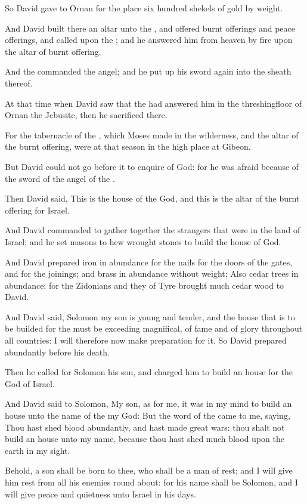 \Verse So David gave to Ornan for the place six hundred shekels of gold by weight.

\Verse And David built there an altar unto the \LORD, and offered burnt offerings and peace offerings, and called upon the \LORD; and he answered him from heaven by fire upon the altar of burnt offering.

\Verse And the \LORD commanded the angel; and he put up his sword again into the sheath thereof.

\Verse At that time when David saw that the \LORD had answered him in the threshingfloor of Ornan the Jebusite, then he sacrificed there.

\Verse For the tabernacle of the \LORD, which Moses made in the wilderness, and the altar of the burnt offering, were at that season in the high place at Gibeon.

\Verse But David could not go before it to enquire of God: for he was afraid because of the sword of the angel of the \LORD.


\Chapter
\Verse Then David said, This is the house of the \LORD God, and this is the altar of the burnt offering for Israel.

\Verse And David commanded to gather together the strangers that were in the land of Israel; and he set masons to hew wrought stones to build the house of God.

\Verse And David prepared iron in abundance for the nails for the doors of the gates, and for the joinings; and brass in abundance without weight; \Verse Also cedar trees in abundance: for the Zidonians and they of Tyre brought much cedar wood to David.

\Verse And David said, Solomon my son is young and tender, and the house that is to be builded for the \LORD must be exceeding magnifical, of fame and of glory throughout all countries: I will therefore now make preparation for it. So David prepared abundantly before his death.

\Verse Then he called for Solomon his son, and charged him to build an house for the \LORD God of Israel.

\Verse And David said to Solomon, My son, as for me, it was in my mind to build an house unto the name of the \LORD my God: \Verse But the word of the \LORD came to me, saying, Thou hast shed blood abundantly, and hast made great wars: thou shalt not build an house unto my name, because thou hast shed much blood upon the earth in my sight.

\Verse Behold, a son shall be born to thee, who shall be a man of rest; and I will give him rest from all his enemies round about: for his name shall be Solomon, and I will give peace and quietness unto Israel in his days.

